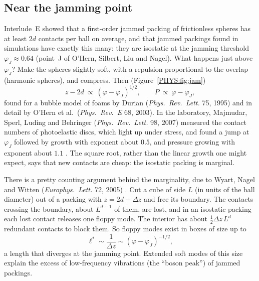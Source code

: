 \subsection*{Near the jamming point}
Interlude~E showed that a first-order jammed packing of frictionless spheres has at least $2d$ contacts
per ball on average, and that jammed packings found in simulations have exactly this many: they are
isostatic at the jamming threshold $\varphi_J\approx0.64$ (point~J of O'Hern, Silbert, Liu and Nagel). What
happens just above $\varphi_J$? Make the spheres slightly soft, with a repulsion proportional to the overlap
(harmonic spheres), and compress. Then (Figure~\ref{PHYS:fig:jam}) 
\[
  z-2d\ \propto\ (\varphi-\varphi_J)^{1/2},\qquad P\ \propto\ \varphi-\varphi_J ,
\]
found for a bubble model of foams by Durian (\emph{Phys.\ Rev.\ Lett.} 75, 1995) and in detail by O'Hern et
al.\ (\emph{Phys.\ Rev.~E} 68, 2003). In the laboratory, Majmudar, Sperl, Luding and Behringer
(\emph{Phys.\ Rev.\ Lett.} 98, 2007) measured the contact numbers of photoelastic discs, which light up under
stress, and found a jump at $\varphi_J$ followed by growth with exponent about $0.5$, and pressure growing with
exponent about $1.1$ . The square root, rather than the linear growth one might expect, says
that new contacts are cheap: the isostatic packing is marginal.

There is a pretty counting argument behind the marginality, due to Wyart, Nagel and Witten
(\emph{Europhys.\ Lett.} 72, 2005) . Cut a cube of side $L$ (in units of the ball diameter)
out of a packing with $z=2d+\Delta z$ and free its boundary. The contacts crossing the boundary, about
$L^{d-1}$ of them, are lost, and in an isostatic packing each lost contact releases one floppy mode. The
interior has about $\frac12\Delta z\,L^d$ redundant contacts to block them. So floppy modes exist in boxes
of size up to
\[
  \ell^*\sim\frac1{\Delta z}\sim(\varphi-\varphi_J)^{-1/2},
\]
a length that diverges at the jamming point. Extended soft modes of this size explain the excess of
low-frequency vibrations (the ``boson peak'') of jammed packings.

